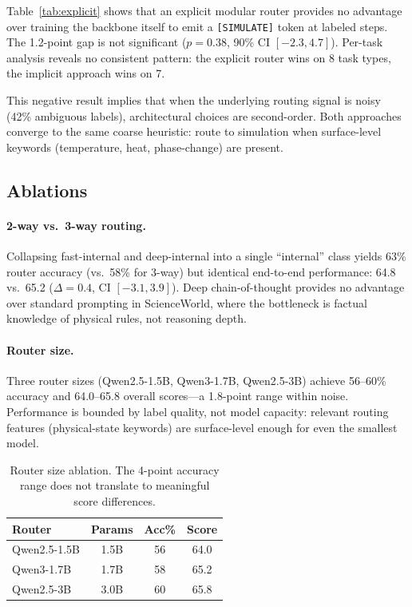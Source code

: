 \documentclass[11pt,a4paper]{article}
\begin{document}
Table~\ref{tab:explicit} shows that an explicit modular router provides no advantage over training the backbone itself to emit a \texttt{[SIMULATE]} token at labeled steps. The 1.2-point gap is not significant ($p{=}0.38$, 90\% CI $[-2.3, 4.7]$). Per-task analysis reveals no consistent pattern: the explicit router wins on 8 task types, the implicit approach wins on 7.

This negative result implies that when the underlying routing signal is noisy (42\% ambiguous labels), architectural choices are second-order. Both approaches converge to the same coarse heuristic: route to simulation when surface-level keywords (temperature, heat, phase-change) are present.

\subsection{Ablations}

\paragraph{2-way vs.\ 3-way routing.}
Collapsing fast-internal and deep-internal into a single ``internal'' class yields 63\% router accuracy (vs.\ 58\% for 3-way) but identical end-to-end performance: 64.8 vs.\ 65.2 ($\Delta{=}0.4$, CI $[-3.1, 3.9]$). Deep chain-of-thought provides no advantage over standard prompting in ScienceWorld, where the bottleneck is factual knowledge of physical rules, not reasoning depth.

\paragraph{Router size.}
Three router sizes (Qwen2.5-1.5B, Qwen3-1.7B, Qwen2.5-3B) achieve 56--60\% accuracy and 64.0--65.8 overall scores---a 1.8-point range within noise. Performance is bounded by label quality, not model capacity: relevant routing features (physical-state keywords) are surface-level enough for even the smallest model.

\begin{table}[t]
\centering
\small
\begin{tabular}{lccc}
\toprule
\textbf{Router} & \textbf{Params} & \textbf{Acc\%} & \textbf{Score} \\
\midrule
Qwen2.5-1.5B & 1.5B & 56 & 64.0 \\
Qwen3-1.7B & 1.7B & 58 & 65.2 \\
Qwen2.5-3B & 3.0B & 60 & 65.8 \\
\bottomrule
\end{tabular}
\caption{Router size ablation. The 4-point accuracy range does not translate to meaningful score differences.}
\label{tab:size}
\end{table}
\end{document}
